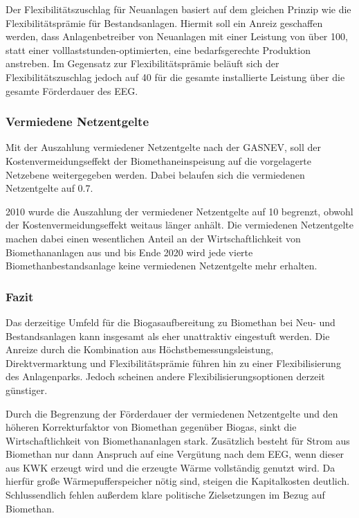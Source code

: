 Der Flexibilitätszuschlag für Neuanlagen basiert auf dem gleichen Prinzip wie die Flexibilitätsprämie für Bestandsanlagen. Hiermit soll ein Anreiz geschaffen werden, dass Anlagenbetreiber von Neuanlagen mit einer Leistung von über \SI{100}{\kw}, statt einer volllaststunden-optimierten, eine bedarfsgerechte Produktion anstreben. Im Gegensatz zur Flexibilitätsprämie beläuft sich der Flexibilitätszuschlag jedoch auf \SI[per-mode=symbol]{40}{\Eurkw} für die gesamte installierte Leistung über die gesamte Förderdauer des \gls{EEG}. \parencite{BJV2014} \parencite{DanielGromke2019}


\subsubsection{Vermiedene Netzentgelte}\label{chap:law_vN}

Mit der Auszahlung vermiedener Netzentgelte nach der \gls{GASNEV}, soll der Kostenvermeidungseffekt der Biomethaneinspeisung auf die vorgelagerte Netzebene weitergegeben werden. Dabei belaufen sich die vermiedenen Netzentgelte auf \SI[per-mode=symbol]{0.7}{\ctkwh}.\smallskip

\SI{2010}{\relax} wurde die Auszahlung der vermiedener Netzentgelte auf \SI{10}{\Jahre} begrenzt, obwohl der Kostenvermeidungseffekt weitaus länger anhält. Die vermiedenen Netzentgelte machen dabei einen wesentlichen Anteil an der Wirtschaftlichkeit von Biomethananlagen aus und bis Ende \SI{2020}{\relax} wird jede vierte Biomethanbestandsanlage keine vermiedenen Netzentgelte mehr erhalten. \parencite{dena2018}


\subsubsection{Fazit}

Das derzeitige Umfeld für die Biogasaufbereitung zu Biomethan bei Neu- und Bestandsanlagen kann insgesamt als eher unattraktiv eingestuft werden. Die Anreize durch die Kombination aus Höchstbemessungsleistung, Direktvermarktung und Flexibilitätsprämie führen hin zu einer Flexibilisierung des Anlagenparks. Jedoch scheinen andere Flexibilisierungsoptionen derzeit günstiger.\smallskip

Durch die Begrenzung der Förderdauer der vermiedenen Netzentgelte und den höheren Korrekturfaktor von Biomethan gegenüber Biogas, sinkt die Wirtschaftlichkeit von Biomethananlagen stark. Zusätzlich besteht für Strom aus Biomethan nur dann Anspruch auf eine Vergütung nach dem \gls{EEG}, wenn dieser aus \gls{KWK} erzeugt wird und die erzeugte Wärme vollständig genutzt wird. Da hierfür große Wärmepufferspeicher nötig sind, steigen die Kapitalkosten deutlich. Schlussendlich fehlen außerdem klare politische Zielsetzungen im Bezug auf Biomethan. \smallskip

